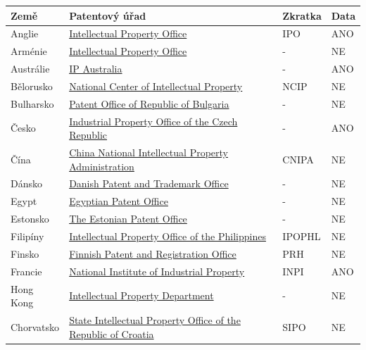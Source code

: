 	\begin{table}[H]
	\centering
	\begin{tabular}{|>{\centering\arraybackslash}p{2.2cm}|>{\centering\arraybackslash}p{7cm}|>{\centering\arraybackslash}p{2cm}|>{\centering\arraybackslash}p{1cm}|} 
	\hline
	\textbf{Země}    & \textbf{Patentový úřad} & \textbf{Zkratka} & \textbf{Data}                \\ 
	\hline
	Anglie & \href{https://www.gov.uk/topic/intellectual-property}{Intellectual Property Office}  & IPO & ANO        \\ 
	\hline
	Arménie & \href{https://www.aipa.am/hy/}{Intellectual Property Office}  & - & NE        \\ 
	\hline
	Austrálie & \href{https://www.ipaustralia.gov.au/}{IP Australia}  & - & ANO         \\ 
	\hline
	Bělorusko & \href{https://www.ncip.by/}{National Center of Intellectual Property}  & NCIP & NE         \\ 
	\hline
	Bulharsko & \href{https://www.bpo.bg/}{Patent Office of Republic of Bulgaria}  & -  & NE       \\ 
	\hline
	Česko & \href{https://upv.gov.cz/}{Industrial Property Office of the Czech Republic}  & -   & ANO      \\ 
	\hline
	Čína & \href{https://www.cnipa.gov.cn/}{China National Intellectual Property Administration}  & CNIPA   & NE      \\ 
	\hline
	Dánsko & \href{https://www.dkpto.org/}{Danish Patent and Trademark Office}  & -    & NE     \\ 
	\hline
	Egypt & \href{http://www.egypo.gov.eg}{Egyptian Patent Office}  & -   & NE      \\ 
	\hline
	Estonsko & \href{https://www.epa.ee/et}{The Estonian Patent Office}  & -   & NE      \\ 
	\hline
	Filipíny & \href{http://www.ipophil.gov.ph/}{Intellectual Property Office of the Philippines}  & IPOPHL & NE        \\ 
	\hline
	Finsko & \href{http://www.prh.fi/en/index.html}{Finnish Patent and Registration Office}  & PRH   & NE      \\ 
	\hline
	Francie & \href{http://www.inpi.fr/}{National Institute of Industrial Property}  & INPI   & ANO      \\ 
	\hline
	Hong Kong & \href{https://www.ipd.gov.hk/index.htm}{Intellectual Property Department}  & -   & NE      \\ 
	\hline
	Chorvatsko & \href{https://www.dziv.hr/}{State Intellectual Property Office of the Republic of Croatia}  & SIPO  & NE       \\ 

\end{tabular}
\end{table}
